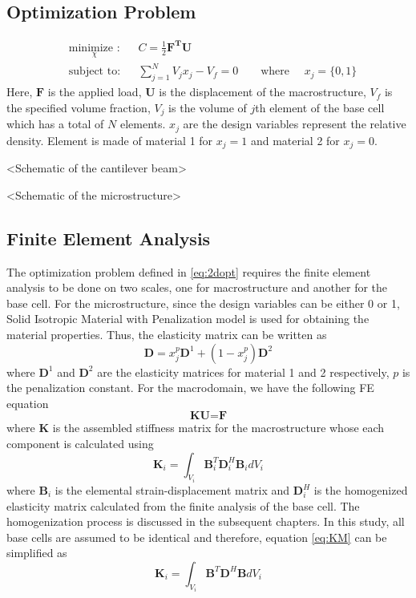 \documentclass[10pt]{article}
\begin{document}
\subsection{Optimization Problem}
\begin{equation}
\label{eq:2dopt}
\begin{aligned}
& \underset{\chi}{\text{minimize :}}
& &  C = \frac{1}{2}\textbf{F}^\textbf{T}\textbf{U}\\
& \text{subject to:}
& & \sum_{j=1}^N V_j x_j - V_f = 0 \qquad \text{where }\quad x_j = \{0, 1\}
\end{aligned}
\end{equation}
Here, $\textbf{F}$ is the applied load, $\textbf{U}$ is the displacement of the macrostructure, $V_f$ is the specified volume fraction, $V_j$ is the volume of $j$th element of the base cell which has a total of $N$ elements. $x_j$ are the design variables represent the relative density. Element is made of material 1 for $x_j=1$ and material 2 for $x_j=0$. 

<Schematic of the cantilever beam>

<Schematic of the microstructure>

\subsection{Finite Element Analysis} 
The optimization problem defined in \eqref{eq:2dopt} requires the finite element analysis to be done on two scales, one for macrostructure and another for the base cell. For the microstructure, since the design variables can be either 0 or 1, Solid Isotropic Material with Penalization model\cite{paper:simp} is used for obtaining the material properties. Thus, the elasticity matrix can be written as
\begin{equation}
\textbf{D} = x_j^p\textbf{D}^1 + (1-x_j^p)\textbf{D}^2
\end{equation}
where $\textbf{D}^1$ and $\textbf{D}^2$ are the elasticity matrices for material 1 and 2 respectively, $p$ is the penalization constant.
For the macrodomain, we have the following FE equation
\begin{equation}
\textbf{KU} = \textbf{F}
\end{equation}
where $\textbf{K}$ is the assembled stiffness matrix for the macrostructure whose each component is calculated using
\begin{equation}
\label{eq:KM}
\textbf{K}_i =  \int_{V_i} \textbf{B}_i^T\textbf{D}_i^H\textbf{B}_i dV_i
\end{equation} 
where $\textbf{B}_i$ is the elemental strain-displacement matrix and $\textbf{D}_i^H$ is the homogenized elasticity matrix calculated from the finite analysis of the base cell. The homogenization process\cite{paper:homogenization} is discussed in the subsequent chapters. In this study, all base cells are assumed to be identical and therefore, equation \eqref{eq:KM} can be simplified as
\begin{equation}
\textbf{K}_i =  \int_{V_i} \textbf{B}^T\textbf{D}^H\textbf{B} dV_i
\end{equation} 
\end{document}
